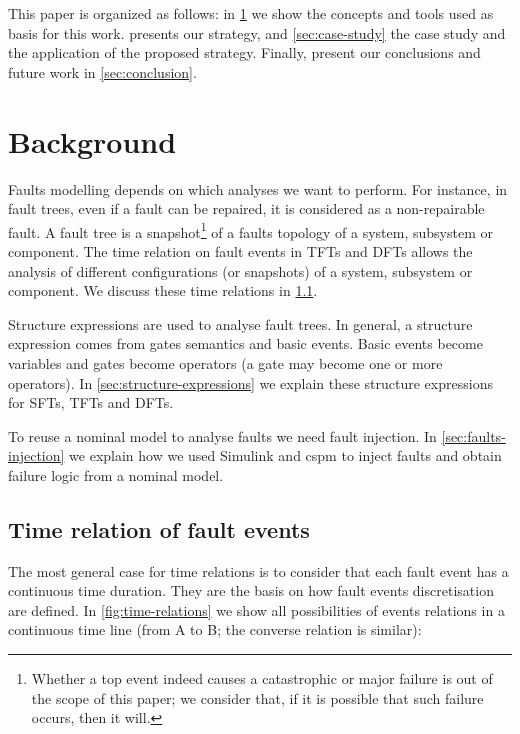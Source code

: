 \documentclass[en,twoside,onehalfspacing,phd]{risethesis}
\newcommand{\simulink}{Simulink\xspace}
\begin{document}
This paper is organized as follows: in \cref{chap:background} we show the concepts and tools used as basis for this work.
 presents our strategy, and \cref{sec:case-study} the case study and the application of the proposed strategy.
Finally, present our conclusions and future work in \cref{sec:conclusion}.

\chapter{Background}
\label{chap:background}

Faults modelling depends on which analyses we want to perform.
For instance, in fault trees, even if a fault can be repaired, it is considered as a non-repairable fault.
A fault tree is a snapshot\footnote{Whether a top event indeed causes a catastrophic or major failure is out of the scope of this paper; we consider that, if it is possible that such failure occurs, then it will.} of a faults topology of a system, subsystem or component.
The time relation on fault events in \acp{TFT} and \acp{DFT} allows the analysis of different configurations (or snapshots) of a system, subsystem or component.
We discuss these time relations in \cref{sec:time-relations}.

Structure expressions are used to analyse fault trees.
In general, a structure expression comes from gates semantics and basic events.
Basic events become variables and gates become operators (a gate may become one or more operators).
In \cref{sec:structure-expressions} we explain these structure expressions for \acp{SFT}, \acp{TFT} and \acp{DFT}.

To reuse a nominal model to analyse faults we need fault injection.
In \cref{sec:faults-injection} we explain how we used \simulink and \ac{cspm} to inject faults and obtain failure logic from a nominal model.

\section{Time relation of fault events}
\label{sec:time-relations}

The most general case for time relations is to consider that each fault event has a continuous time duration.
They are the basis on how fault events discretisation are defined.
In \cref{fig:time-relations} we show all possibilities of events relations in a continuous time line (from A to B; the converse relation is similar):
\end{document}
